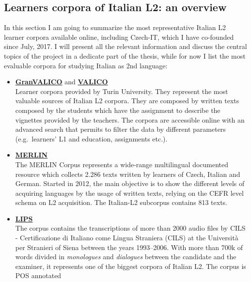 \documentclass[a4paper,twoside,12pt,chapterprefix=false,bibliography=totocnumbered,listof=flat]{scrbook}
\begin{document}
\subsection{Learners corpora of Italian L2: an
overview}\label{learners-corpora-of-italian-l2-an-overview}

In this section I am going to summarize the most representative Italian
L2 learner corpora available online, including Czech-IT, which I have
co-founded since July, 2017. I will present all the relevant information
and discuss the central topics of the project in a dedicate part of the
thesis, while for now I list the most evaluable corpora for studying
Italian as 2nd language:

\begin{itemize}
\item
  \textbf{\href{http://www.valico.org/valico_b_CORPUS.html}{GranVALICO}}
  and \textbf{\href{http://www.valico.org/valico_CORPUS.html}{VALICO}}
  \citep{valico}\\
  Learner corpora provided by Turin University. They represent the most
  valuable sources of Italian L2 corpora. They are composed by written
  texts composed by the students which have the assignment to describe
  the vignettes provided by the teachers. The corpora are accessible
  online with an advanced search that permits to filter the data by
  different parameters (e.g.~learners' L1 and education, assignments
  etc.).
\item
  \textbf{\href{http://merlin-platform.eu}{MERLIN}} \citep{merlin}\\
  The MERLIN Corpus represents a wide-range multilingual documented
  resource which collects 2.286 texts written by learners of Czech,
  Italian and German. Started in 2012, the main objective is to show the
  different levels of acquiring languages by the usage of written texts,
  relying on the CEFR level schema on L2 acquisition. The Italian-L2
  subcorpus contains 813 texts.
\item
  \textbf{\href{http://parlaritaliano.it/index.php/en/data/653-corpus-lips}{LIPS}}
  \citep{lips}\\
  The corpus contains the transcriptions of more than 2000 audio files
  by CILS - Certificazione di Italiano come Lingua Straniera (CILS) at
  the Università per Stranieri of Siena between the years 1993--2006.
  With more than 700k of words divided in \emph{monologues} and
  \emph{dialogues} between the candidate and the examiner, it represents
  one of the biggest corpora of Italian L2. The corpus is POS annotated

\end{itemize}
\end{document}
